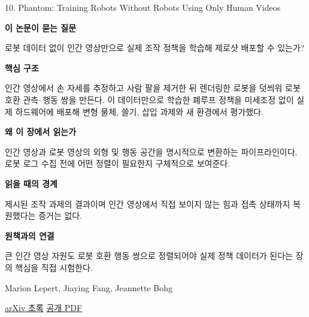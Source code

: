 \documentclass[11pt,openany]{book}
\begin{document}
\begin{termcard}{10. Phantom: Training Robots Without Robots Using Only Human Videos}

\par

\medskip

{\sffamily\bfseries\color{deepblue} 이 논문이 묻는 질문}\par

로봇 데이터 없이 인간 영상만으로 실제 조작 정책을 학습해 제로샷 배포할 수 있는가?

\smallskip

{\sffamily\bfseries\color{deepblue} 핵심 구조}\par

인간 영상에서 손 자세를 추정하고 사람 팔을 제거한 뒤 렌더링한 로봇을 덧씌워 로봇 호환 관측–행동 쌍을 만든다. 이 데이터만으로 학습한 폐루프 정책을 미세조정 없이 실제 하드웨어에 배포해 변형 물체, 쓸기, 삽입 과제와 새 환경에서 평가했다.

\smallskip

{\sffamily\bfseries\color{deepblue} 왜 이 장에서 읽는가}\par

인간 영상과 로봇 영상의 외형 및 행동 공간을 명시적으로 변환하는 파이프라인이다. 로봇 로그 수집 전에 어떤 정렬이 필요한지 구체적으로 보여준다.

\smallskip

{\sffamily\bfseries\color{coral} 읽을 때의 경계}\par

제시된 조작 과제의 결과이며 인간 영상에서 직접 보이지 않는 힘과 접촉 상태까지 복원했다는 증거는 없다.

\smallskip

{\sffamily\bfseries\color{teal} 원책과의 연결}\par

큰 인간 영상 자원도 로봇 호환 행동 쌍으로 정렬되어야 실제 정책 데이터가 된다는 장의 핵심을 직접 시험한다.

\medskip

{\footnotesize\color{muted} Marion Lepert, Jiaying Fang, Jeannette Bohg\par

\href{https://arxiv.org/abs/2503.00779}{arXiv 초록} \quad \href{https://arxiv.org/pdf/2503.00779}{공개 PDF}\par}

\end{termcard}
\end{document}
